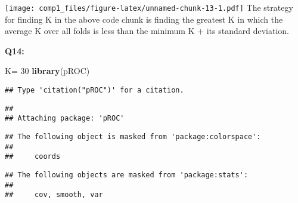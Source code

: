 \documentclass[]{article}
\newenvironment{Shaded}{\begin{snugshade}}{\end{snugshade}}
\newcommand{\KeywordTok}[1]{\textcolor[rgb]{0.13,0.29,0.53}{\textbf{#1}}}
\newcommand{\DecValTok}[1]{\textcolor[rgb]{0.00,0.00,0.81}{#1}}
\newcommand{\StringTok}[1]{\textcolor[rgb]{0.31,0.60,0.02}{#1}}
\newcommand{\NormalTok}[1]{#1}
\begin{document}
\texttt{[image: comp1\_files/figure-latex/unnamed-chunk-13-1.pdf]} The
strategy for finding K in the above code chunk is finding the greatest K
in which the average K over all folds is less than the minimum K + its
standard deviation.

\textbf{Q14:}

\begin{Shaded}
\begin{Highlighting}[]
\NormalTok{K=}\StringTok{ }\DecValTok{30}
\KeywordTok{library}\NormalTok{(pROC)}
\end{Highlighting}
\end{Shaded}

\begin{verbatim}
## Type 'citation("pROC")' for a citation.
\end{verbatim}

\begin{verbatim}
## 
## Attaching package: 'pROC'
\end{verbatim}

\begin{verbatim}
## The following object is masked from 'package:colorspace':
## 
##     coords
\end{verbatim}

\begin{verbatim}
## The following objects are masked from 'package:stats':
## 
##     cov, smooth, var
\end{verbatim}
\end{document}
